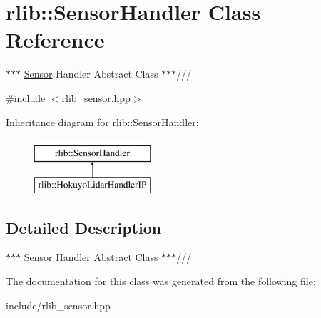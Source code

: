 \hypertarget{classrlib_1_1SensorHandler}{\section{rlib\-:\-:Sensor\-Handler Class Reference}
\label{classrlib_1_1SensorHandler}
}


$\ast$$\ast$$\ast$ \hyperlink{classrlib_1_1Sensor}{Sensor} Handler Abstract Class $\ast$$\ast$$\ast$///  




{\ttfamily \#include $<$rlib\-\_\-sensor.\-hpp$>$}

Inheritance diagram for rlib\-:\-:Sensor\-Handler\-:\begin{figure}[H]
\begin{center}
\leavevmode
\includegraphics[height=2.000000cm]{classrlib_1_1SensorHandler}
\end{center}
\end{figure}


\subsection{Detailed Description}
$\ast$$\ast$$\ast$ \hyperlink{classrlib_1_1Sensor}{Sensor} Handler Abstract Class $\ast$$\ast$$\ast$/// 

The documentation for this class was generated from the following file\-:\begin{DoxyCompactItemize}
\item 
include/rlib\-\_\-sensor.\-hpp\end{DoxyCompactItemize}
